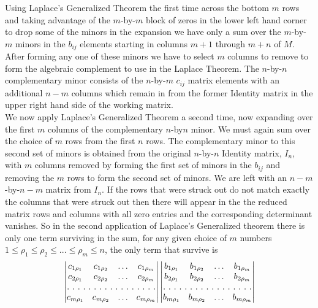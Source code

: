Using Laplace's Generalized Theorem the first time across the bottom $m$ rows and taking advantage of the $m$-by-$m$ block of zeros in the lower left hand corner to drop some of the minors in the expansion we have only a sum over the $m$-by-$m$ minors in the $b_{ij}$ elements starting in columns $m+1$ through $m+n$ of $M$. After forming any one of these minors we have to select $m$ columns to remove to form the algebraic complement to use in the Laplace Theorem. The $n$-by-$n$ complementary minor consists of the $n$-by-$m$ $c_{ij}$ matrix elements with an additional $n-m$ columns which remain in from the former Identity matrix in the upper right hand side of the working matrix.\\

We now apply Laplace's Generalized Theorem a second time, now expanding over the first $m$ columns of the complementary $n$-by$n$ minor. We must again sum over the choice of $m$ rows from the first $n$ rows. The complementary minor to this second set of minors is obtained from the original $n$-by-$n$ Identity matrix, $I_n$, with $m$ columns removed by forming the first set of minors in the $b_{ij} $ and removing the $m$ rows to form the second set of minors. We are left with an $n-m$-by-$n-m$ matrix from $I_{n}$. If the rows that were struck out do not match exactly the columns that were struck out then there will appear in the the reduced matrix rows and columns with all zero entries and the corresponding determinant vanishes. So in the second application of Laplace's Generalized theorem there is only one term surviving in the sum, for any given choice of $m$ numbers 
$1 \le \rho_1 \le \rho_2 \le  ...\le \rho_m \le n$, the only term that survive is 
\begin{equation}
\begin{vmatrix}
c_{1\rho_1} & c_{1\rho_2}  & \hdots & c_{1\rho_m}  \\
c_{2\rho_1} & c_{2\rho_2}  & \hdots & c_{2\rho_m}  \\
\hdotsfor[2]{4}\\
c_{m\rho_1} & c_{m\rho_2}  & \hdots & c_{m\rho_m}  \\
\end{vmatrix}
\begin{vmatrix}
b_{1\rho_1} & b_{1\rho_2}  & \hdots & b_{1\rho_m}  \\
b_{2\rho_1} & b_{2\rho_2}  & \hdots & b_{2\rho_m}  \\
\hdotsfor[2]{4}\\
b_{m\rho_1} & b_{m\rho_2}  & \hdots & b_{m\rho_m}  \\
\end{vmatrix}
\end{equation}

